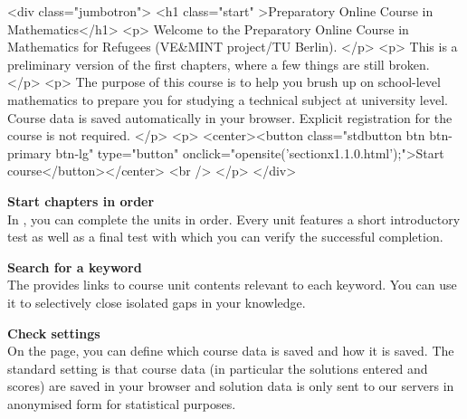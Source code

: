 \begin{MSectionStart}
\MGlobalStart
\begin{html}

<div class="jumbotron">
<h1 class="start" >Preparatory Online Course in Mathematics</h1>
<p>
Welcome to the Preparatory Online Course in Mathematics for Refugees (VE&MINT project/TU Berlin).
</p>
<p>
This is a preliminary version of the first chapters, where a few things are still broken.
</p>
<p>
The purpose of this course is to help you brush up on school-level mathematics to prepare you for studying a technical subject at university level.
Course data is saved automatically in your browser. Explicit registration for the course is not required.
</p>
<p>
<center><button class="stdbutton btn btn-primary btn-lg" type="button" onclick="opensite('sectionx1.1.0.html');">Start course</button></center>
<br />
</p>
</div>
\end{html}


\textbf{Start chapters in order}\\
In , you can complete the units in order. Every unit features a short introductory test
as well as a final test with which you can verify the successful completion. 

\textbf{Search for a keyword}\\
The  provides links to course unit contents relevant to each keyword.
You can use it to selectively close isolated gaps in your knowledge.

\textbf{Check settings}\\
On the  page, you can define which course data is saved and how it is saved.
The standard setting is that course data (in particular the solutions entered and scores) are saved in your
browser and solution data is only sent to our servers in anonymised form for statistical purposes.


\end{MSectionStart}
